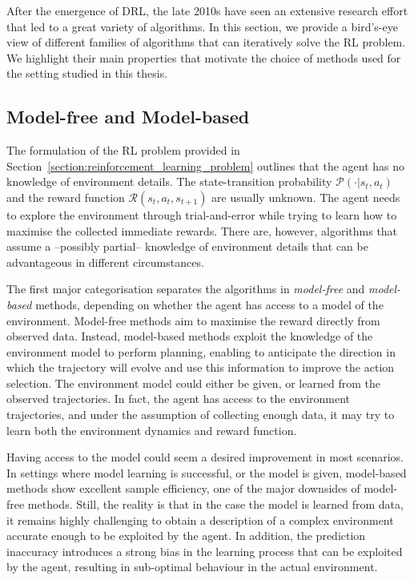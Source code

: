 After the emergence of \acl{DRL}, the late 2010s have seen an extensive research effort that led to a great variety of algorithms.
In this section, we provide a bird's-eye view of different families of algorithms that can iteratively solve the \ac{RL} problem.
We highlight their main properties that motivate the choice of methods used for the setting studied in this thesis.

\subsection{Model-free and Model-based}

The formulation of the \ac{RL} problem provided in Section~\ref{section:reinforcement_learning_problem} outlines that the agent has no knowledge of environment details.
The state-transition probability $\mathcal{P}(\cdot|s_t, a_t)$ and the reward function $\mathcal{R}(s_t, a_t, s_{t+1})$ are usually unknown.
The agent needs to explore the environment through trial-and-error while trying to learn how to maximise the collected immediate rewards.
There are, however, algorithms that assume a --possibly partial-- knowledge of environment details that can be advantageous in different circumstances.

The first major categorisation separates the algorithms in \emph{model-free} and \emph{model-based} methods, depending on whether the agent has access to a model of the environment.
Model-free methods aim to maximise the reward directly from observed data.
Instead, model-based methods exploit the knowledge of the environment model to perform planning, enabling to anticipate the direction in which the trajectory will evolve and use this information to improve the action selection.
The environment model could either be given, or learned from the observed trajectories.
In fact, the agent has access to the environment trajectories, and under the assumption of collecting enough data, it may try to learn both the environment dynamics and reward function.

Having access to the model could seem a desired improvement in most scenarios.
In settings where model learning is successful, or the model is given, model-based methods show excellent sample efficiency, one of the major downsides of model-free methods.
Still, the reality is that in the case the model is learned from data, it remains highly challenging to obtain a description of a complex environment accurate enough to be exploited by the agent.
In addition, the prediction inaccuracy introduces a strong bias in the learning process that can be exploited by the agent, resulting in sub-optimal behaviour in the actual environment.

